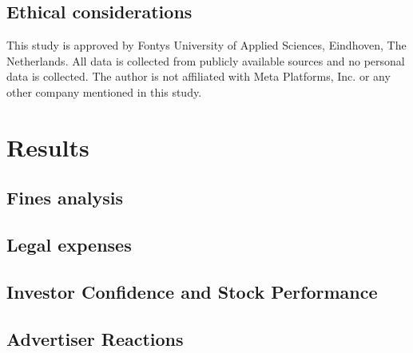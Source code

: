 \documentclass[12pt, a4paper]{article}
\begin{document}
\subsection*{Ethical considerations}

This study is approved by Fontys University of Applied Sciences, Eindhoven, The
Netherlands. All data is collected from publicly available sources and no
personal data is collected. The author is not affiliated with Meta Platforms,
Inc. or any other company mentioned in this study.

\section*{Results}

\subsection*{Fines analysis}


\subsection*{Legal expenses}


\subsection*{Investor Confidence and Stock Performance}


\subsection*{Advertiser Reactions}
\end{document}
